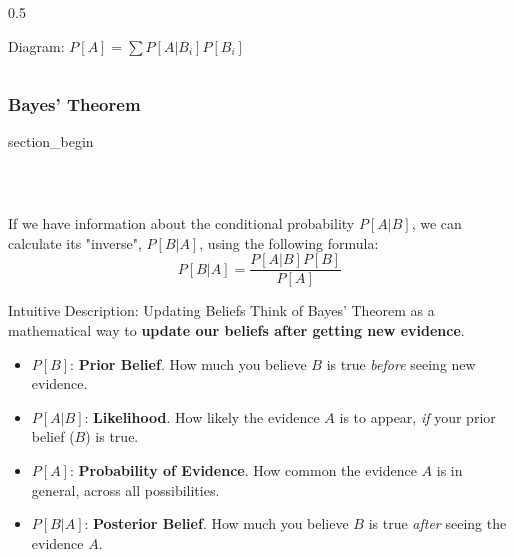 \begin{frame}
\begin{columns}[T]
\begin{column}{0.5\textwidth}
\begin{block}{Diagram: \(P[A] = \sum P[A|B_i]P[B_i]\)}
            \end{block}
        \end{column}
    \end{columns}
\end{frame}

\subsubsection{Bayes' Theorem}
\begin{frame} \vfill \centering \begin{beamercolorbox}[sep=10pt,center,shadow=false,rounded=true]{section_begin} \insertsubsubsectionhead\par \end{beamercolorbox} \vfill \end{frame}
\begin{frame}
\frametitle{\ }
\vspace{-7mm}
\footnotesize
  \begin{Teorema}
    If we have information about the conditional probability $P[A|B]$, we can calculate its "inverse", $P[B|A]$, using the following formula:
    \[
      P[B|A] = \frac{P[A|B] P[B]}{P[A]}
    \]
  \end{Teorema}

  \begin{block}{Intuitive Description: Updating Beliefs}
    Think of Bayes' Theorem as a mathematical way to \textbf{update our beliefs after getting new evidence}.
    \begin{itemize}
        \item $P[B]$: \textbf{Prior Belief}. How much you believe $B$ is true \textit{before} seeing new evidence.
        \item $P[A|B]$: \textbf{Likelihood}. How likely the evidence $A$ is to appear, \textit{if} your prior belief ($B$) is true.
        \item $P[A]$: \textbf{Probability of Evidence}. How common the evidence $A$ is in general, across all possibilities.
        \item $P[B|A]$: \textbf{Posterior Belief}. How much you believe $B$ is true \textit{after} seeing the evidence $A$.
    \end{itemize}
  \end{block}
\end{frame}

